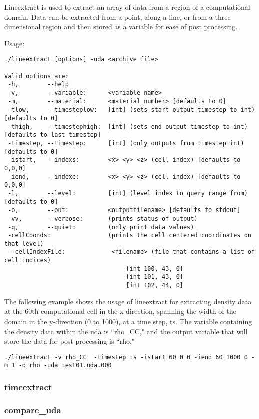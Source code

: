 Lineextract is used to extract an array of data from a region of a computational domain. Data can be extracted from a point, along a line, or from a three dimensional region and then stored as a variable for ease of post processing. 

Usage: \begin{Verbatim}[fontsize=\footnotesize]
./lineextract [options] -uda <archive file>

Valid options are:
 -h,        --help
 -v,        --variable:      <variable name>
 -m,        --material:      <material number> [defaults to 0]
 -tlow,     --timesteplow:   [int] (sets start output timestep to int) [defaults to 0]
 -thigh,    --timestephigh:  [int] (sets end output timestep to int) [defaults to last timestep]
 -timestep, --timestep:      [int] (only outputs from timestep int) [defaults to 0]
 -istart,   --indexs:        <x> <y> <z> (cell index) [defaults to 0,0,0]
 -iend,     --indexe:        <x> <y> <z> (cell index) [defaults to 0,0,0]
 -l,        --level:         [int] (level index to query range from) [defaults to 0]
 -o,        --out:           <outputfilename> [defaults to stdout]
 -vv,       --verbose:       (prints status of output)
 -q,        --quiet:         (only print data values)
 -cellCoords:                (prints the cell centered coordinates on that level)
 --cellIndexFile:             <filename> (file that contains a list of cell indices)
                                  [int 100, 43, 0]
                                  [int 101, 43, 0]
                                  [int 102, 44, 0] 
\end{Verbatim}

The following example shows the usage of lineextract for extracting density data at the 60th computational cell in the x-direction, spanning the width of the domain in the y-direction (0 to 1000), at a time step, ts. The variable containing the density data within the uda is ``rho\_CC," and the output variable that will store the data for post processing is ``rho." 
\begin{Verbatim}[fontsize=\footnotesize]
./lineextract -v rho_CC  -timestep ts -istart 60 0 0 -iend 60 1000 0 -m 1 -o rho -uda test01.uda.000
\end{Verbatim}


\subsubsection{timeextract}

\subsubsection{compare\_uda}

